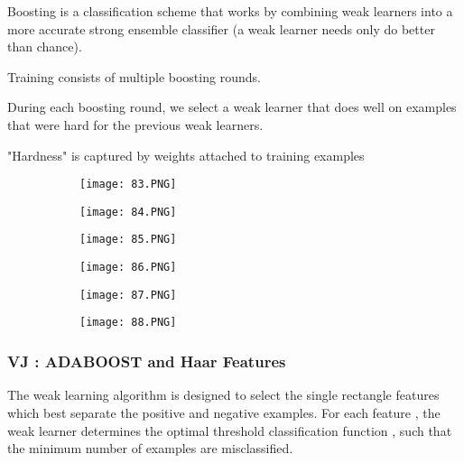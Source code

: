 \documentclass{article}
\begin{document}
Boosting is a classification scheme that works by combining weak learners into a more accurate strong ensemble classifier (a weak learner needs only do better than chance).

Training consists of multiple boosting rounds.

During each boosting round, we select a weak learner that does well on examples that were hard for the previous weak learners.

"Hardness" is captured by weights attached to training examples



\begin{figure}[ht!]
  \centering
  \begin{subfigure}[b]{0.5\linewidth}
    \texttt{[image: 83.PNG]}
  \end{subfigure}
     \begin{subfigure}[b]{0.49\textwidth}
         \centering
         \texttt{[image: 84.PNG]}
     \end{subfigure}
\end{figure}


\begin{figure}[ht!]
  \centering
  \begin{subfigure}[b]{0.5\linewidth}
    \texttt{[image: 85.PNG]}
  \end{subfigure}
     \begin{subfigure}[b]{0.49\textwidth}
         \centering
         \texttt{[image: 86.PNG]}
     \end{subfigure}
\end{figure}

\begin{figure}[ht!]
  \centering
  \begin{subfigure}[b]{0.5\linewidth}
    \texttt{[image: 87.PNG]}
  \end{subfigure}
     \begin{subfigure}[b]{0.49\textwidth}
         \centering
         \texttt{[image: 88.PNG]}
     \end{subfigure}
\end{figure}

\subsubsection{VJ : ADABOOST and Haar Features}

The weak learning algorithm is designed to select the single rectangle features which best separate the positive and negative examples. For each feature , the weak learner determines the optimal threshold classification function , such that the minimum number of examples are misclassified.
\end{document}
